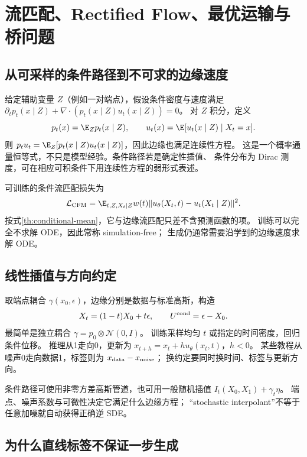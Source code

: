 \chapter{流匹配、Rectified Flow、最优运输与桥问题}
\label{th:flow}

\section{从可采样的条件路径到不可求的边缘速度}

给定辅助变量 $Z$（例如一对端点），假设条件密度与速度满足
$\partial_t p_t(x\mid Z)+\nabla\cdot(p_t(x\mid Z)u_t(x\mid Z))=0$。
对 $Z$ 积分，定义
\begin{equation}\label{th:fm-marginal}
p_t(x)=\E_Zp_t(x\mid Z),\qquad
u_t(x)=\E[u_t(x\mid Z)\mid X_t=x].
\end{equation}
则 $p_tu_t=\E_Z[p_t(x\mid Z)u_t(x\mid Z)]$，因此边缘也满足连续性方程。
这是一个概率通量恒等式，不只是模型经验。条件路径若是确定性插值、
条件分布为 Dirac 测度，可在相应可积条件下用连续性方程的弱形式表述。

可训练的条件流匹配损失为
\begin{equation}\label{th:cfm}
\mathcal L_{\rm CFM}=\E_{t,Z,X_t\mid Z}
 w(t)\|u_\theta(X_t,t)-u_t(X_t\mid Z)\|^2.
\end{equation}
按式\eqref{th:conditional-mean}，它与边缘流匹配只差不含预测函数的项。
训练可以完全不求解 ODE，因此常称 simulation-free；
生成仍通常需要沿学到的边缘速度求解 ODE。

\section{线性插值与方向约定}

取端点耦合 $\gamma(x_0,\epsilon)$，边缘分别是数据与标准高斯，构造
\[
X_t=(1-t)X_0+t\epsilon,\qquad U^{\rm cond}=\epsilon-X_0.
\]
最简单是独立耦合 $\gamma=p_0\otimes\mathcal N(0,I)$。
训练采样均匀 $t$ 或指定的时间密度，回归条件位移。
推理从1走向0，更新为 $x_{t+h}=x_t+h u_\theta(x_t,t)$，$h<0$。
某些教程从噪声0走向数据1，标签则为 $x_{\rm data}-x_{\rm noise}$；
换约定要同时换时间、标签与更新方向。

条件路径可使用非零方差高斯管道，也可用一般随机插值
$I_t(X_0,X_1)+\gamma_t\eta$。
端点、噪声系数与可微性决定它满足什么边缘方程；
“stochastic interpolant”不等于任意加噪就自动获得正确逆 SDE。

\section{为什么直线标签不保证一步生成}

